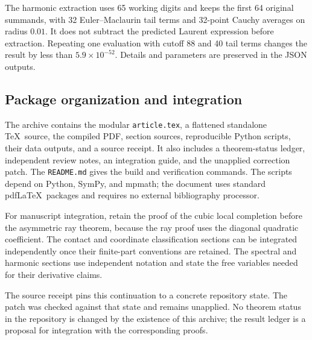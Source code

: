 The harmonic extraction uses 65 working digits and keeps the first
64 original summands, with 32 Euler--Maclaurin tail terms and
32-point Cauchy averages on radius $0.01$. It does not subtract the
predicted Laurent expression before extraction. Repeating one
evaluation with cutoff 88 and 40 tail terms changes the result by
less than $5.9\times10^{-52}$. Details and parameters are preserved
in the JSON outputs.

\subsection{Package organization and integration}

The archive contains the modular \texttt{article.tex}, a flattened
standalone \TeX\ source, the compiled PDF, section sources,
reproducible Python scripts, their data outputs, and a source receipt.
It also includes a theorem-status ledger, independent review notes,
an integration guide, and the unapplied correction patch.
The \texttt{README.md} gives the build and verification commands.
The scripts depend on Python, SymPy, and mpmath; the document uses
standard pdf\LaTeX\ packages and requires no external bibliography
processor.

For manuscript integration, retain the proof of the cubic local
completion before the asymmetric ray theorem, because the ray proof
uses the diagonal quadratic coefficient. The contact and coordinate
classification sections can be integrated independently once their
finite-part conventions are retained. The spectral and harmonic
sections use independent notation and state the free variables
needed for their derivative claims.

The source receipt pins this continuation to a concrete repository
state. The patch was checked against that state and remains
unapplied. No theorem status in the repository is changed by the
existence of this archive; the result ledger is a proposal for
integration with the corresponding proofs.
